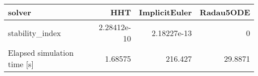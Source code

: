 \begin{tabular}{lrrr}
\hline
 solver                      &         HHT &   ImplicitEuler &   Radau5ODE \\
\hline
 stability\_index             & 2.28412e-10 &     2.18227e-13 &      0      \\
 Elapsed simulation time [s] & 1.68575     &   216.427       &     29.8871 \\
\hline
\end{tabular}
